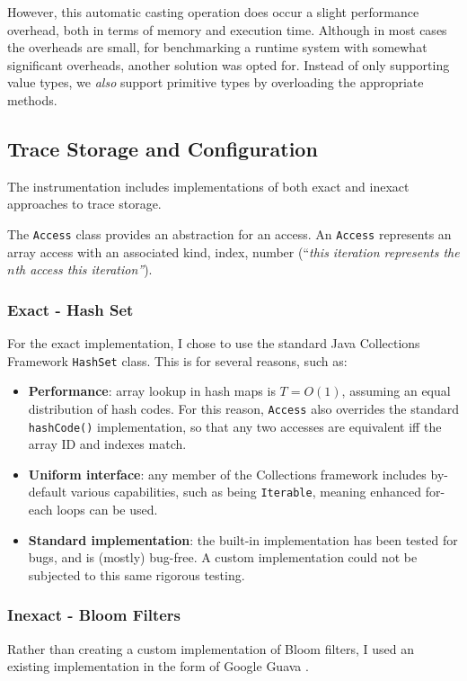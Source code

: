 		However, this automatic casting operation does occur a slight performance overhead, both in terms of memory and execution time. Although in most cases the overheads are small, for benchmarking a runtime system with somewhat significant overheads, another solution was opted for. Instead of only supporting value types, we \emph{also} support primitive types by overloading the appropriate methods. 
	
	\subsection{Trace Storage and Configuration} \label{sec:runtime/implementation/trace}
	The instrumentation includes implementations of both exact and inexact approaches to trace storage.
	
	The \texttt{Access} class provides an abstraction for an access. An \texttt{Access} represents an array access with an associated kind, index, number (``\textit{this iteration represents the $n$th access this iteration''}).
	
		\subsubsection{Exact - Hash Set} \label{sec:runtime/implementation/trace/hashset}
		For the exact implementation, I chose to use the standard Java Collections Framework \texttt{HashSet} class. This is for several reasons, such as:
		
		\begin{itemize}
			\item \textbf{Performance}: array lookup in hash maps is $T=O(1)$, assuming an equal distribution of hash codes. For this reason, \texttt{Access} also overrides the standard \texttt{hashCode()} implementation, so that any two accesses are equivalent iff the array ID and indexes match.
			
			\item \textbf{Uniform interface}: any member of the Collections framework includes by-default various capabilities, such as being \texttt{Iterable}, meaning enhanced for-each loops can be used.
			
			\item \textbf{Standard implementation}: the built-in implementation has been tested for bugs, and is (mostly) bug-free. A custom implementation could not be subjected to this same rigorous testing.
		\end{itemize}
		
		\subsubsection{Inexact - Bloom Filters} \label{sec:runtime/implementation/trace/bloom}
			Rather than creating a custom implementation of Bloom filters, I used an existing implementation in the form of Google Guava \citep{GuavaBloomFilter}.\
		
